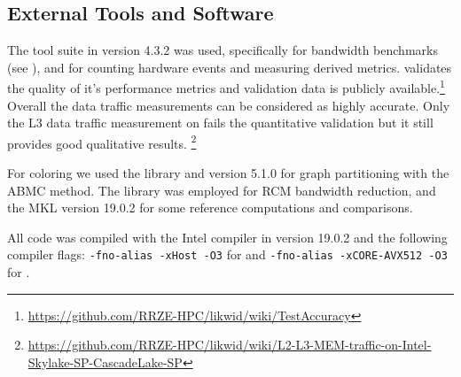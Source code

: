 \subsection{External Tools and Software}
The \LIKWID \cite{LIKWID} tool suite in version 4.3.2 was used, specifically
\likwidBench for bandwidth benchmarks (see ), and
\likwidPerfctr for counting hardware events 
 and measuring derived metrics.
 \LIKWID validates the quality of it's performance metrics
  and validation data is publicly available.\footnote{\href{https://github.com/RRZE-HPC/likwid/wiki/TestAccuracy}{https://github.com/RRZE-HPC/likwid/wiki/TestAccuracy}} Overall the \LIKWID data traffic measurements can be considered as highly accurate. Only the L3 data traffic measurement on \SKX fails the quantitative validation but it still provides good qualitative results.  
 \footnote{\href{https://github.com/RRZE-HPC/likwid/wiki/L2-L3-MEM-traffic-on-Intel-Skylake-SP-CascadeLake-SP}{https://github.com/RRZE-HPC/likwid/wiki/L2-L3-MEM-traffic-on-Intel-Skylake-SP-CascadeLake-SP}}
 
 For coloring we used the \COLPACK \cite{COLPACK} library
 and \METIS \cite{METIS} version 5.1.0 for graph partitioning
 with the \acrshort{ABMC} method. The \SPMP \cite{SpMP} library was employed for
  \acrshort{RCM} bandwidth reduction, and the \acrshort{MKL} version 19.0.2
 for some reference computations and comparisons.

All code was compiled with the Intel compiler in version 19.0.2 and the following compiler flags: {\tt -fno-alias -xHost -O3} for \IVB and {\tt -fno-alias -xCORE-AVX512 -O3} for \SKX.

